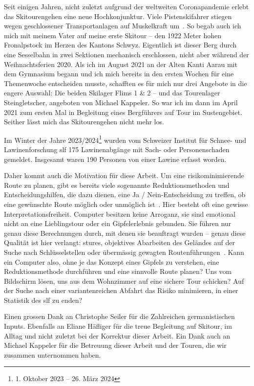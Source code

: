 


Seit einigen Jahren, nicht zuletzt aufgrund der weltweiten Coronapandemie erlebt das Skitourengehen eine neue Hochkonjunktur. Viele Pistenskifahrer stiegen wegen geschlossener Transportanlagen auf Muskelkraft um~\cite{sacCoronaTrend}. So begab auch ich mich mit meinem Vater auf meine erste Skitour – den 1922 Meter hohen Fronalpstock im Herzen des Kantons Schwyz. Eigentlich ist dieser Berg durch eine Sesselbahn in zwei Sektionen mechanisch erschlossen, nicht aber während der Weihnachtsferien 2020.
Als ich im August 2021 an der Alten Kanti Aarau mit dem Gymnasium begann und ich mich bereits in den ersten Wochen für eine Themenwoche entscheiden musste, schafften es für mich nur drei Angebote in die engere Auswahl: Die beiden Skilager Flims 1 \& 2 – und das Tourenlager Steingletscher, angeboten von Michael Kappeler. So war ich im dann im April 2021 zum ersten Mal in Begleitung eines Bergführers auf Tour im Sustengebiet. Seither lässt mich das Skitourengehen nicht mehr los.

Im Winter der Jahre 2023/2024\footnote{1. Oktober 2023 -- 26. März 2024} wurden vom Schweizer Institut für Schnee- und Lawinenforschung \gls{slf} 175 Lawinenabgänge mit Sach- oder Personenschaden gemeldet. Insgesamt waren 190 Personen von einer Lawine erfasst worden.~\cite{slfWinterbericht202324}

Daher kommt auch die Motivation für diese Arbeit. Um eine risikominimierende Route zu planen, gibt es bereits viele sogenannte Reduktionsmethoden und Entscheidungshilfen, die dazu dienen, eine Ja / Nein-Entscheidung zu treffen, ob eine gewünschte Route möglich oder unmöglich ist~\cite{skitourenguruReduktionsmethoden}\cite{harveyrhynerschweizerlawinenkunde}.
Hier besteht oft eine gewisse Interpretationsfreiheit. Computer besitzen keine Arroganz, sie sind emotional nicht an eine Lieblingstour oder ein Gipfelerlebnis gebunden. Sie führen nur genau diese Berechnungen durch, mit denen sie beauftragt wurden – genau diese Qualität ist hier verlangt: stures, objektives Abarbeiten des Geländes auf der Suche nach Schlüsselstellen oder übermässig gewagten Routenführungen~\cite{harveyrhynerschweizerlawinenkunde}. Kann ein Computer also, ohne je das Konzept eines Gipfels zu verstehen, eine Reduktionsmethode durchführen und eine sinnvolle Route planen? Uns vom Bildschirm lösen, uns aus dem Wohnzimmer auf eine sichere Tour schicken? 
Auf der Suche nach einer variantenreichen Abfahrt das Risiko minimieren, in einer Statistik des \gls{slf} zu enden?

Einen grossen Dank an Christophe Seiler für die Zahlreichen germanistischen Inputs. Ebenfalls an Eliane Häfliger für die treue Begleitung auf Skitour, im Alltag und nicht zuletzt bei der Korrektur dieser Arbeit. Ein Dank auch an Michael Kappeler für die Betreuung dieser Arbeit und der Touren, die wir zusammen unternommen haben.


